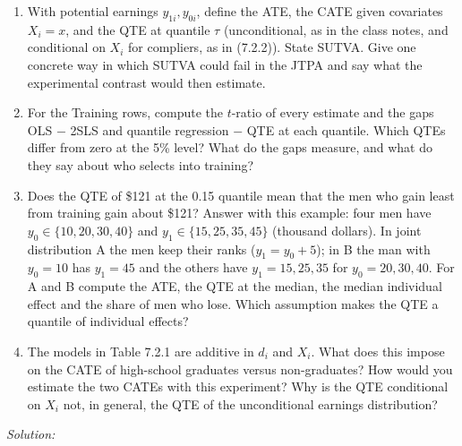 \documentclass[11pt,a4paper]{article}
\newif\ifsolucoes
\newcommand{\espacoresol}{4.5cm}   %
\newcommand{\resolespaco}{\ifsolucoes\else\par\textit{Solution:}\vspace{\espacoresol}\par\fi}
\begin{document}
\begin{enumerate}[label=(\alph*)]
\item With potential earnings $y_{1i},y_{0i}$, define the ATE, the CATE given covariates $X_i=x$, and the
QTE at quantile $\tau$ (unconditional, as in the class notes, and conditional on $X_i$ for compliers, as in
(7.2.2)). State SUTVA. Give one concrete way in which SUTVA could fail in the JTPA and say what the
experimental contrast would then estimate.
\item For the Training rows, compute the $t$-ratio of every estimate and the gaps OLS $-$ 2SLS and
quantile regression $-$ QTE at each quantile. Which QTEs differ from zero at the 5\% level? What do the
gaps measure, and what do they say about who selects into training?
\item Does the QTE of \$121 at the 0.15 quantile mean that the men who gain least from training gain about
\$121? Answer with this example: four men have $y_0\in\{10,20,30,40\}$ and $y_1\in\{15,25,35,45\}$
(thousand dollars). In joint distribution A the men keep their ranks ($y_1=y_0+5$); in B the man with
$y_0=10$ has $y_1=45$ and the others have $y_1=15,25,35$ for $y_0=20,30,40$. For A and B compute the ATE,
the QTE at the median, the median individual effect and the share of men who lose. Which assumption
makes the QTE a quantile of individual effects?
\item The models in Table 7.2.1 are additive in $d_i$ and $X_i$. What does this impose on the CATE of
high-school graduates versus non-graduates? How would you estimate the two CATEs with this experiment?
Why is the QTE conditional on $X_i$ not, in general, the QTE of the unconditional earnings distribution?
\end{enumerate}
\resolespaco
\end{document}

